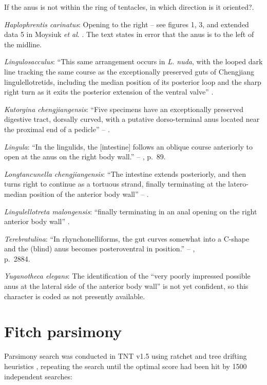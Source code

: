 \documentclass[openany]{book}
\theoremstyle{definition}
\theoremstyle{definition}
\theoremstyle{definition}
\theoremstyle{remark}
\begin{document}
If the anus is not within the ring of tentacles, in which direction is
it oriented?.

\emph{Haplophrentis carinatus}: Opening to the right -- see figures 1,
3, and extended data 5 in Moysiuk \emph{et al}.
\citeyearpar{Moysiuk2017Hyolithsare}. The text states in error that the
anus is to the left of the midline.

\emph{Lingulosacculus}: ``This same arrangement occurs in \emph{L.
nuda}, with the looped dark line tracking the same course as the
exceptionally preserved guts of Chengjiang lingulellotretids, including
the median position of its posterior loop and the sharp right turn as it
exits the posterior extension of the ventral valve''
\citep[p.310]{Balthasar2009EarlyCambrian}.

\emph{Kutorgina chengjiangensis}: ``Five specimens have an exceptionally
preserved digestive tract, dorsally curved, with a putative
dorso-terminal anus located near the proximal end of a pedicle'' --
\citet{Zhang2007Rhynchonelliformeanbrachiopods}.

\emph{Lingula}: ``In the lingulids, the {[}intestine{]} follows an
oblique course anteriorly to open at the anus on the right body wall.''
-- \citet{Williams1997BrachiopodaRevised}, p.~89.

\emph{Longtancunella chengjiangensis}: ``The intestine extends
posteriorly, and then turns right to continue as a tortuous strand,
finally terminating at the latero-median position of the anterior body
wall'' -- \citet{Zhang2007Agregarious}.

\emph{Lingulellotreta malongensis}: ``finally terminating in an anal
opening on the right anterior body wall'' \citep[p.66]{Zhang2007Noteon}.

\emph{Terebratulina}: ``In rhynchonelliforms, the gut curves somewhat
into a C-shape and the (blind) anus becomes posteroventral in
position.'' -- \citet{Williams2007PartH},\\
p.~2884.

\emph{Yuganotheca elegans}: The identification of the ``very poorly
impressed possible anus at the lateral side of the anterior body wall''
is not yet confident, so this character is coded as not presently
available.

\hypertarget{fitch}{%
\chapter{Fitch parsimony}\label{fitch}}

Parsimony search was conducted in TNT v1.5 \citep{Goloboff2016} using
ratchet and tree drifting heuristics \citep{Goloboff1999, Nixon1999},
repeating the search until the optimal score had been hit by 1500
independent searches:
\end{document}
